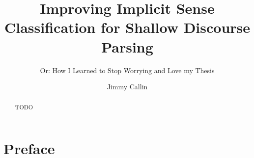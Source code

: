 \documentclass[master,times]{stpthesis}
\begin{document}
\author{Jimmy Callin}
\title{Improving Implicit Sense Classification for Shallow Discourse Parsing}
\subtitle{Or: How I Learned to Stop Worrying and Love my Thesis}

\maketitle
\frontmatter*

\begin{abstract}
  TODO
\end{abstract}

\clearpage
\tableofcontents*

\chapter{Preface}

\mainmatter*








\end{document}

